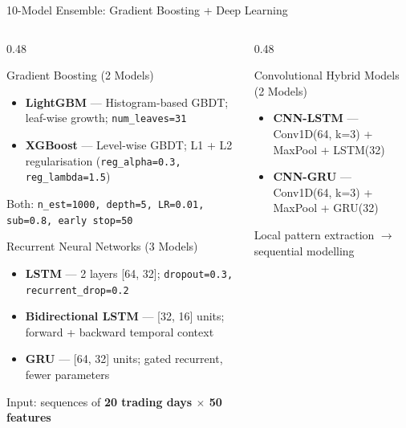 \documentclass[aspectratio=43,11pt]{beamer}
\begin{document}
\begin{frame}[shrink=12]{10-Model Ensemble: Gradient Boosting + Deep Learning}
    \begin{columns}[T]
        \begin{column}{0.48\textwidth}
            \begin{block}{Gradient Boosting (2 Models)}
                \footnotesize\setlength{\itemsep}{1pt}
                \begin{itemize}
                    \item \textbf{LightGBM} --- Histogram-based GBDT; leaf-wise growth; \texttt{num\_leaves=31}
                    \item \textbf{XGBoost} --- Level-wise GBDT; L1 + L2 regularisation (\texttt{reg\_alpha=0.3, reg\_lambda=1.5})
                \end{itemize}
                Both: \texttt{n\_est=1000, depth=5, LR=0.01, sub=0.8, early stop=50}
            \end{block}
            \begin{block}{Recurrent Neural Networks (3 Models)}
                \footnotesize\setlength{\itemsep}{1pt}
                \begin{itemize}
                    \item \textbf{LSTM} --- 2 layers [64, 32]; \texttt{dropout=0.3, recurrent\_drop=0.2}
                    \item \textbf{Bidirectional LSTM} --- [32, 16] units; forward + backward temporal context
                    \item \textbf{GRU} --- [64, 32] units; gated recurrent, fewer parameters
                \end{itemize}
                Input: sequences of \textbf{20 trading days $\times$ 50 features}
            \end{block}
        \end{column}
        \begin{column}{0.48\textwidth}
            \begin{block}{Convolutional Hybrid Models (2 Models)}
                \footnotesize\setlength{\itemsep}{1pt}
                \begin{itemize}
                    \item \textbf{CNN-LSTM} --- Conv1D(64, k=3) + MaxPool + LSTM(32)
                    \item \textbf{CNN-GRU}  --- Conv1D(64, k=3) + MaxPool + GRU(32)
                \end{itemize}
                Local pattern extraction $\to$ sequential modelling

\end{block}
\end{column}
\end{columns}
\end{frame}
\end{document}
